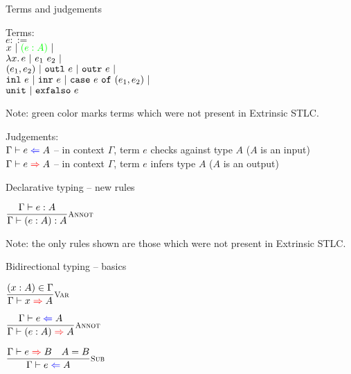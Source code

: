 \documentclass{beamer}
\begin{document}
\begin{frame}{Terms and judgements}

Terms: \\
$e ::=$ \\
\qquad $x \pipe \newterm{\annot{e}{A}} \pipe$ \\
\qquad $\fun{x}{e} \pipe \app{e_1}{e_2} \pipe$ \\
\qquad $\pair{e_1}{e_2} \pipe \outl{e} \pipe \outr{e} \pipe$ \\
\qquad $\inl{e} \pipe \inr{e} \pipe \case{e}{e_1}{e_2} \pipe$ \\
\qquad $\unit \pipe \exfalso{e}$

\vspace{2em}

Note: green color marks terms which were not present in Extrinsic STLC.

\vspace{2em}

Judgements: \\
$\fullcheck{\Gamma}{e}{A}$ -- in context $\Gamma$, term $e$ checks against type $A$ ($A$ is an input) \\
$\fullinfer{\Gamma}{e}{A}$ -- in context $\Gamma$, term $e$ infers type $A$ ($A$ is an output)

\end{frame}

\begin{frame}{Declarative typing -- new rules}

\begin{center}
  $\infrule[Annot]{\typing{e}{A}}{\typing{\annot{e}{A}}{A}}$
\end{center}

\vspace{2em}

Note: the only rules shown are those which were not present in Extrinsic STLC.

\end{frame}

\begin{frame}{Bidirectional typing -- basics}

\begin{center}
  $\infrule[Var]{\sidecond{(x : A) \in \Gamma}}{\infer{x}{A}}$

  \vspace{2em}

  $\infrule[Annot]{\check{e}{A}}{\infer{\annot{e}{A}}{A}}$

  \vspace{2em}

  $\infrule[Sub]{\infer{e}{B} \quad \sidecond{A = B}}{\check{e}{A}}$
\end{center}

\end{frame}
\end{document}
